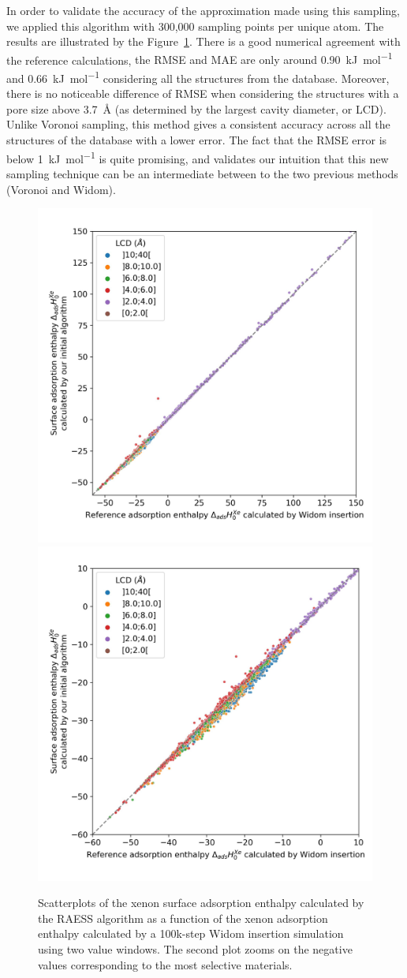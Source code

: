 \documentclass[main]{subfiles}
\begin{document}
In order to validate the accuracy of the approximation made using this sampling, we applied this algorithm with 300,000 sampling points per unique atom. The results are illustrated by the Figure~\ref{fgr:surface_sampling}. There is a good numerical agreement with the reference calculations, {the RMSE and MAE are only around \SI{0.90}{\kilo\joule\per\mole} and \SI{0.66}{\kilo\joule\per\mole}} considering all the structures from the database. Moreover, there is no noticeable difference of RMSE when considering the structures with a pore size above \SI{3.7}{\angstrom} (as determined by the largest cavity diameter, or LCD). Unlike Voronoi sampling, this method gives a consistent accuracy across all the structures of the database with a lower error. The fact that the {RMSE} error is below \SI{1}{\kilo\joule\per\mole} is quite promising, and validates our intuition that this new sampling technique can be an intermediate between to the two previous methods (Voronoi and Widom).

\begin{figure}[ht]
  \centering
  \includegraphics[width=0.48\linewidth]{figures/3-fastsim/H_Xe_widom_vs_H_Xe_surface_spiral_overview.jpg}
  \includegraphics[width=0.48\linewidth]{figures/3-fastsim/H_Xe_widom_vs_H_Xe_surface_spiral_zoom.jpg}
    \caption{Scatterplots of the xenon surface adsorption enthalpy calculated by the RAESS algorithm as a function of the xenon adsorption enthalpy calculated by a 100k-step Widom insertion simulation using two value windows. The second plot zooms on the negative values corresponding to the most selective materials.}\label{fgr:surface_sampling}
\end{figure}
\end{document}
